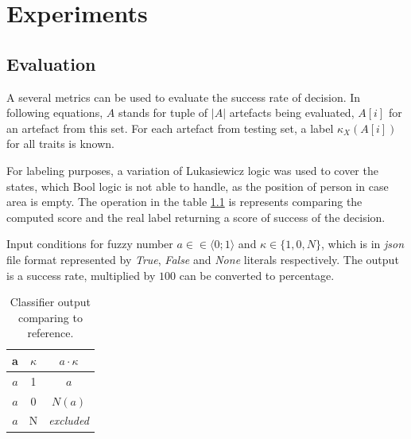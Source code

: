 



\chapter{Experiments}

\section{Evaluation}
\label{section:evaluationMetrics}
A several metrics can be used to evaluate the success rate of decision.
In following equations, $A$ stands for tuple of $|A|$ artefacts being
evaluated, $A[i]$ for an artefact from this set. For each artefact from testing
set, a label $\kappa_{X}(A[i])$ for all traits is known.

For labeling purposes, a variation of Lukasiewicz logic was used to cover
the states, which Bool logic is not able to handle, as the position of person
in case area is empty. The operation in the table \ref{table:3stateLogicOp} is
represents comparing the computed score and the real label returning a score
of success of the decision.

Input conditions for fuzzy number $a \in \in \langle 0;1 \rangle$
and $\kappa \in \{ 1, 0, N\}$, which is in {\it json} file format represented
by {\it True}, {\it False} and {\it None} literals respectively. The output
is a success rate, multiplied by $100$ can be converted to percentage.

\begin{table}
\begin{center}
\begin{tabular}{|c|c|c|} \hline
\textbf{a}  & \textbf{$\kappa$} & \textbf{$a \cdot \kappa$} \\ \hline
$a$         & 1               & $a$                       \\ \hline
$a$         & 0               & $N(a)$                    \\ \hline
$a$         & N               & \it{excluded}             \\ \hline
\end{tabular}
\caption{Classifier output comparing to reference.\label{table:3stateLogicOp} }
\end{center}
\end{table}

